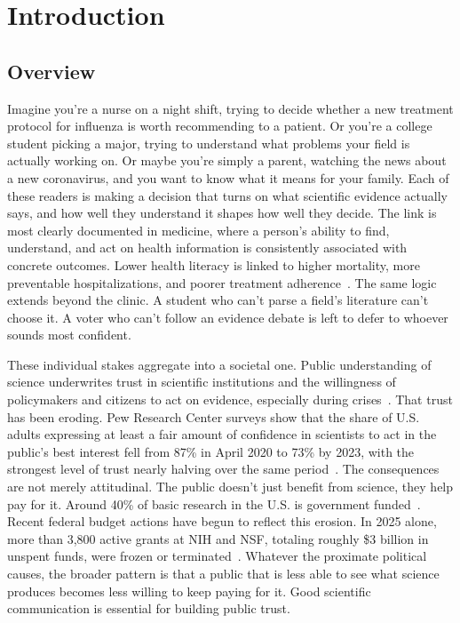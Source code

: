 \chapter{Introduction} \label{chap:introduction}

\section{Overview}

Imagine you're a nurse on a night shift, trying to decide whether a new treatment protocol for influenza is worth recommending to a patient. Or you're a college student picking a major, trying to understand what problems your field is actually working on. Or maybe you're simply a parent, watching the news about a new coronavirus, and you want to know what it means for your family. Each of these readers is making a decision that turns on what scientific evidence actually says, and how well they understand it shapes how well they decide. The link is most clearly documented in medicine, where a person's ability to find, understand, and act on health information is consistently associated with concrete outcomes. Lower health literacy is linked to higher mortality, more preventable hospitalizations, and poorer treatment adherence~\cite{berkman2011lowhealthliteracy, paasche-orlow2007causal}. The same logic extends beyond the clinic. A student who can't parse a field's literature can't choose it. A voter who can't follow an evidence debate is left to defer to whoever sounds most confident.
 
These individual stakes aggregate into a societal one. Public understanding of science underwrites trust in scientific institutions and the willingness of policymakers and citizens to act on evidence, especially during crises~\cite{cologna2025trust, intemann2023scicomm}. That trust has been eroding. Pew Research Center surveys show that the share of U.S. adults expressing at least a fair amount of confidence in scientists to act in the public's best interest fell from 87\% in April 2020 to 73\% by 2023, with the strongest level of trust nearly halving over the same period~\cite{pew2023trust, pew2024trust}. The consequences are not merely attitudinal. The public doesn't just benefit from science, they help pay for it. Around 40\% of basic research in the U.S. is government funded~\cite{Pece_Anderson_2024}. Recent federal budget actions have begun to reflect this erosion. In 2025 alone, more than 3,800 active grants at NIH and NSF, totaling roughly \$3 billion in unspent funds, were frozen or terminated~\cite{sciencenews2025cuts, Agarwal_2025}. Whatever the proximate political causes, the broader pattern is that a public that is less able to see what science produces becomes less willing to keep paying for it. Good scientific communication is essential for building public trust.
 
